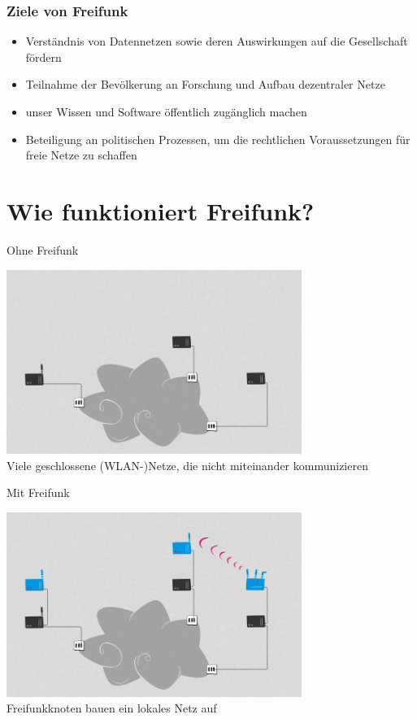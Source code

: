 \documentclass[10pt]{beamer}
\begin{document}
\begin{frame}
	\frametitle{Ziele von Freifunk}
	\begin{itemize}[<+->]
		\item Verständnis von Datennetzen sowie deren Auswirkungen auf die Gesellschaft fördern
		\item Teilnahme der Bevölkerung an Forschung und Aufbau dezentraler Netze
		\item unser Wissen und Software öffentlich zugänglich machen
		\item Beteiligung an politischen Prozessen, um die rechtlichen Voraussetzungen für freie Netze zu schaffen
	\end{itemize}
\end{frame}

\section{Wie funktioniert Freifunk?}

\begin{frame}{Ohne Freifunk}
	\begin{center}
		\includegraphics[height=6cm]{images/network_1} \\
		\vfill
		Viele geschlossene (WLAN-)Netze, die nicht miteinander kommunizieren
	\end{center}
\end{frame}

\begin{frame}{Mit Freifunk}
	\begin{center}
		\includegraphics[height=6cm]{images/network_2} \\
		\vfill
		Freifunkknoten bauen ein lokales Netz auf
	\end{center}
\end{frame}
\end{document}
